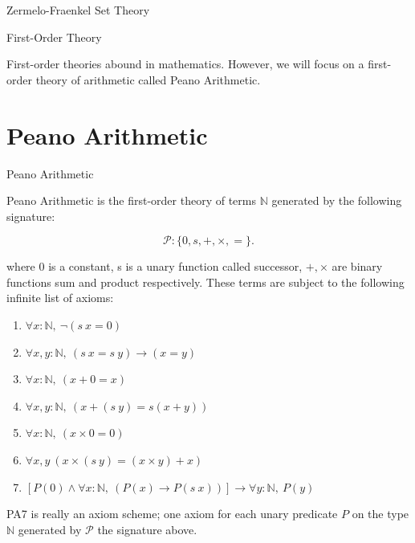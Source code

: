 \documentclass{book}
\begin{document}
    \begin{eg}{Zermelo-Fraenkel Set Theory}


    \end{eg}

    {First-Order Theory}

    

    First-order theories abound in mathematics. However, we will focus on a first-order theory of arithmetic called Peano Arithmetic. 

    \newpage
    \section{Peano Arithmetic}

    {Peano Arithmetic}

        Peano Arithmetic is the first-order theory of terms $\mathbb{N}$ generated by the following signature:

        $$\mathcal{P} : \{0, s, +, \times, =\}.$$

        where 0 is a constant, s is a unary function called successor, $+, \times$ are binary functions sum and product respectively. These terms are subject to the following infinite list of axioms:

        \vspace{0.2cm}

        \begin{enumerate}
            \item[PA1: ] $\forall x : \mathbb{N}, \ \lnot(s \ x = 0)$
            \item[PA2: ] $\forall x,y : \mathbb{N}, \ (s \ x = s \ y) \to (x = y)$		\item[PA3: ] $\forall x : \mathbb{N}, \ (x + 0 = x)$
            \item[PA4: ] $\forall x,y : \mathbb{N}, \ (x + (s \ y) = s(x + y))$
            \item[PA5: ] $\forall x : \mathbb{N}, \ (x \times 0 = 0)$
            \item[PA6: ] $\forall x,y \ (x \times (s \ y) = (x \times y) + x)$
            \item[PA7: ] $[P(0) \land \forall x : \mathbb{N}, \ (P(x) \to P(s \ x))] \rightarrow \forall y : \mathbb{N}, \ P(y)$
        \end{enumerate}

        \vspace{0.2cm}

        PA7 is really an axiom scheme; one axiom for each unary predicate $P$ on the type $\mathbb{N}$ generated by $\mathcal{P}$ the signature above. 
\end{document}

